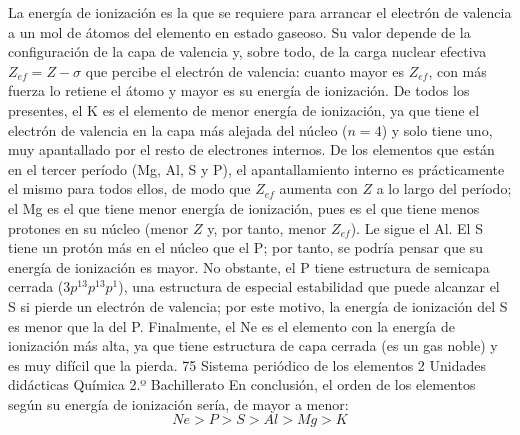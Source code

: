 \begin{question}
\begin{solu}
        La energía de ionización es la que se requiere para arrancar
        el electrón de valencia a un mol de átomos del elemento en
        estado gaseoso. Su valor depende de la configuración de la
        capa de valencia y, sobre todo, de la carga nuclear efectiva
        \(Z_{ef} = Z - \sigma\) que percibe el electrón de valencia:
        cuanto mayor es \(Z_{ef}\), con más fuerza lo retiene el átomo y
        mayor es su energía de ionización.
        De todos los presentes, el K es el elemento de menor energía
        de ionización, ya que tiene el electrón de valencia en la capa
        más alejada del núcleo (\(n=4\)) y solo tiene uno, muy apantallado
        por el resto de electrones internos.
        De los elementos que están en el tercer período (Mg, Al, S y P),
        el apantallamiento interno es prácticamente el mismo para todos
        ellos, de modo que \(Z_{ef}\) aumenta con \(Z\) a lo largo del
        período; el Mg es el que tiene menor energía de ionización,
        pues es el que tiene menos protones en su núcleo (menor \(Z\) y,
        por tanto, menor \(Z_{ef}\)). Le sigue el Al. El S tiene
        un protón más en el núcleo que el P; por tanto, se podría
        pensar que su energía de ionización es mayor. No obstante,
        el P tiene estructura de semicapa cerrada (\(3p^13p^13p^1\)), una
        estructura de especial estabilidad que puede alcanzar el S si
        pierde un electrón de valencia; por este motivo, la energía de
        ionización del S es menor que la del P.
        Finalmente, el Ne es el elemento con la energía de ionización
        más alta, ya que tiene estructura de capa cerrada (es un gas
        noble) y es muy difícil que la pierda.
        75
        Sistema periódico de los elementos 2
        Unidades didácticas Química 2.º Bachillerato
        En conclusión, el orden de los elementos según su energía de
        ionización sería, de mayor a menor:
        \[Ne > P > S > Al > Mg > K\]
    \end{solu}

\end{question}

